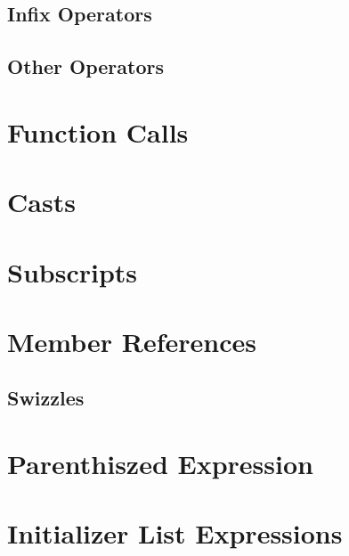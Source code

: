 \subsection{Infix Operators}

\subsection{Other Operators}

\section{Function Calls}

\section{Casts}

\section{Subscripts}

\section{Member References}

\subsection{Swizzles}

\section{Parenthiszed Expression}

\section{Initializer List Expressions}